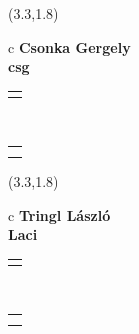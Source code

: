 \documentclass[11pt]{article}
\begin{document}
\makebox(3.3,1.8){
  \renewcommand\arraystretch{1.3}
  \begin{tabular}[c]{c}
    \hspace{8.5mm}
    \LARGE\bf{ Csonka Gergely }\\
    \hspace{8.5mm}
    \Large{ csg }\\
    \renewcommand\arraystretch{3}
    \begin{tabular}[c]{c}
      \centering
      \fontfamily{phv}\selectfont{
        \textbf{
          \textsc{
            \scriptsize{
            \color{Bright}{ Ismerkedő }\color{Bright}{ Webmester }\color{Bright}{ Sminkmester }\color{Dark}{ Programozó }
            }
          }
        }
      }
    \end{tabular}
    \\
    \renewcommand\arraystretch{1}
    \begin{tabular}{p{3.3in}}
      \hspace{.7cm}\\
      \hspace{.7cm}\emph{  }\\
    \end{tabular}
  \end{tabular}
}

\makebox(3.3,1.8){
  \renewcommand\arraystretch{1.3}
  \begin{tabular}[c]{c}
    \hspace{8.5mm}
    \LARGE\bf{ Tringl László }\\
    \hspace{8.5mm}
    \Large{ Laci }\\
    \renewcommand\arraystretch{3}
    \begin{tabular}[c]{c}
      \centering
      \fontfamily{phv}\selectfont{
        \textbf{
          \textsc{
            \scriptsize{
            \color{Dark}{ Ismerkedő }\color{Bright}{ Webmester }\color{Bright}{ Sminkmester }\color{Bright}{ Programozó }
            }
          }
        }
      }
    \end{tabular}
    \\
    \renewcommand\arraystretch{1}
    \begin{tabular}{p{3.3in}}
      \hspace{.7cm}\\
      \hspace{.7cm}\emph{  }\\
    \end{tabular}
  \end{tabular}
}
\end{document}
